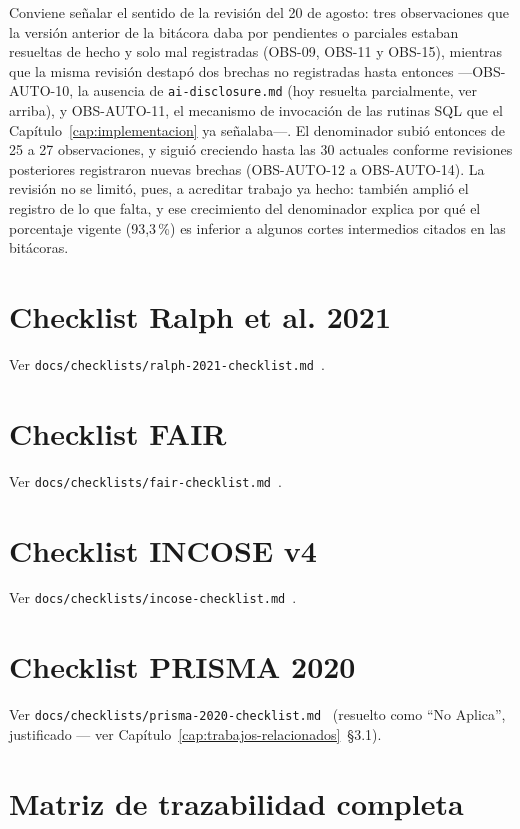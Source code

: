 Conviene señalar el sentido de la revisión del 20 de agosto: tres
observaciones que la versión anterior de la bitácora daba por pendientes o
parciales estaban resueltas de hecho y solo mal registradas (OBS-09, OBS-11 y
OBS-15), mientras que la misma revisión destapó dos brechas no registradas
hasta entonces ---OBS-AUTO-10, la ausencia de \texttt{ai-disclosure.md}
(hoy resuelta parcialmente, ver arriba), y OBS-AUTO-11, el mecanismo de
invocación de las rutinas SQL que el Capítulo~\ref{cap:implementacion} ya
señalaba---. El denominador subió entonces de 25 a 27 observaciones, y
siguió creciendo hasta las 30 actuales conforme revisiones posteriores
registraron nuevas brechas (OBS-AUTO-12 a OBS-AUTO-14). La revisión no se
limitó, pues, a acreditar trabajo ya hecho: también amplió el registro de
lo que falta, y ese crecimiento del denominador explica por qué el
porcentaje vigente (93,3\,\%) es inferior a algunos cortes intermedios
citados en las bitácoras.

\chapter{Checklist Ralph et al. 2021}
\label{anexo:b}

Ver \texttt{docs/checklists/ralph-2021-checklist.md}~\cite{RALPH2021}.

\chapter{Checklist FAIR}
\label{anexo:c}

Ver \texttt{docs/checklists/fair-checklist.md}~\cite{WILKINSON2016}.

\chapter{Checklist INCOSE v4}
\label{anexo:d}

Ver \texttt{docs/checklists/incose-checklist.md}~\cite{INCOSE2023}.

\chapter{Checklist PRISMA 2020}
\label{anexo:e}

Ver \texttt{docs/checklists/prisma-2020-checklist.md}~\cite{PRISMA2021}
(resuelto como ``No Aplica'', justificado --- ver
Capítulo~\ref{cap:trabajos-relacionados}~\S3.1).

\chapter{Matriz de trazabilidad completa}
\label{anexo:f}

